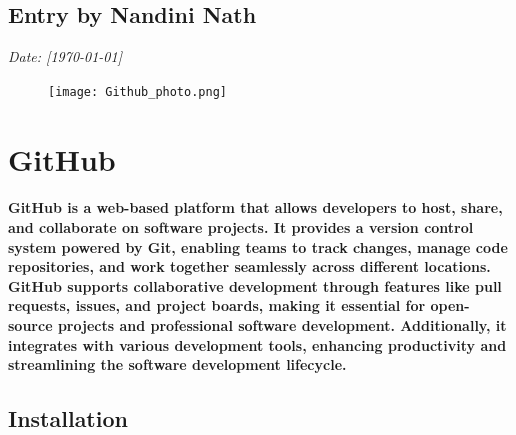 \documentclass[12pt, a4paper]{article}
\begin{document}
\subsection*{Entry by Nandini Nath}
\textit{Date: [\today]}\\

\begin{figure}[h!]
   \centering
    \texttt{[image: Github\_photo.png]}
\end{figure}

\vspace{-1cm} %

\section*{\Huge{GitHub}}
\paragraph{GitHub is a web-based platform that allows developers to host, share, and collaborate on software projects. It provides a version control system powered by Git, enabling teams to track changes, manage code repositories, and work together seamlessly across different locations. GitHub supports collaborative development through features like pull requests, issues, and project boards, making it essential for open-source projects and professional software development. Additionally, it integrates with various development tools, enhancing productivity and streamlining the software development lifecycle.}

\subsection*{Installation}
\end{document}
